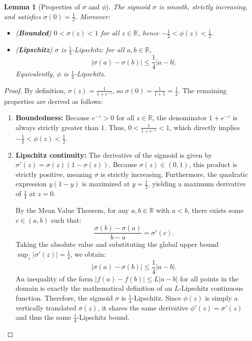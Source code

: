\documentclass{article}
\theoremstyle{plain}
\newtheorem{lemma}{Lemma}
\theoremstyle{definition}
\theoremstyle{remark}
\numberwithin{theorem}{section}
\numberwithin{definition}{section}
\numberwithin{remark}{section}
\numberwithin{lemma}{section}
\numberwithin{assumption}{section}
\newcommand{\R}{\mathbb{R}}
\begin{document}
\begin{lemma}[Properties of $\sigma$ and $\phi$]
\label{lem:sig_props}
The sigmoid $\sigma$ is smooth, strictly increasing, and satisfies $\sigma(0)=\tfrac12$.
Moreover:
\begin{itemize}[leftmargin=1.5em]
    \item (\textbf{Bounded}) $0<\sigma(z)<1$ for all $z\in\R$, hence $-\tfrac12<\phi(z)<\tfrac12$.
    \item (\textbf{Lipschitz}) $\sigma$ is $\tfrac14$-Lipschitz: for all $a,b\in\R$,
    \[
    |\sigma(a)-\sigma(b)| \le \frac14 |a-b|.
    \]
    Equivalently, $\phi$ is $\tfrac14$-Lipschitz.
\end{itemize}
\end{lemma}

\begin{proof}
By definition, $\sigma(z) = \frac{1}{1+e^{-z}}$, so $\sigma(0) = \frac{1}{1+1} = \frac{1}{2}$. The remaining properties are derived as follows:
\begin{enumerate}[label=(\roman*), leftmargin=1.5em]
    \item \textbf{Boundedness:} Because $e^{-z} > 0$ for all $z \in \R$, the denominator $1+e^{-z}$ is always strictly greater than $1$. Thus, $0 < \frac{1}{1+e^{-z}} < 1$, which directly implies $-\tfrac12 < \phi(z) < \tfrac12$.
    \item \textbf{Lipschitz continuity:} The derivative of the sigmoid is given by $\sigma'(z) = \sigma(z)(1-\sigma(z))$. Because $\sigma(z) \in (0, 1)$, this product is strictly positive, meaning $\sigma$ is strictly increasing. Furthermore, the quadratic expression $y(1-y)$ is maximized at $y = \tfrac12$, yielding a maximum derivative of $\tfrac14$ at $z=0$. 
    
    By the Mean Value Theorem, for any $a, b \in \R$ with $a < b$, there exists some $c \in (a, b)$ such that:
    \[
    \frac{\sigma(b) - \sigma(a)}{b - a} = \sigma'(c).
    \]
    Taking the absolute value and substituting the global upper bound $\sup_z |\sigma'(z)| = \tfrac14$, we obtain:
    \[
    |\sigma(a)-\sigma(b)| \le \frac14 |a-b|.
    \]
    An inequality of the form $|f(a)-f(b)| \leq L |a-b|$ for all points in the domain is exactly the mathematical definition of an $L$-Lipschitz continuous function. Therefore, the sigmoid $\sigma$ is $\tfrac14$-Lipschitz. Since $\phi(z)$ is simply a vertically translated $\sigma(z)$, it shares the same derivative $\phi'(z) = \sigma'(z)$ and thus the same $\tfrac14$-Lipschitz bound.
\end{enumerate}
\end{proof}
\end{document}
